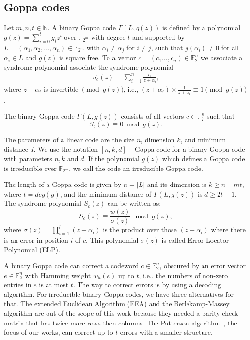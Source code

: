 \subsection{Goppa codes}
Let $m, n, t\in \mathbb{N}$. A binary Goppa code $\Gamma(L, g(z))$ is defined by a polynomial $g(z) = \sum_{i=0}^{t}g_iz^i$ over $\mathbb{F}_{2^m}$ with degree $t$ and supported by $L = (\alpha_1, \alpha_2, \dots, \alpha_n) \in \mathbb{F}_{2^m}$ with $\alpha_i \neq \alpha_j$ for $i\neq j$, such that $g(\alpha_i) \neq 0$ for all $\alpha_i \in L$ and $g(z)$ is square free. To a vector  $c = (c_1 \ldots, c_{n}) \in \mathbb{F}^n_{2}$ we associate a syndrome polynomial associate the syndrome polynomial
\begin{align}
  S_c(z) = \sum_{i=1}^{n} \frac{c_i}{z+\alpha_i},  
\end{align}
where ${z+\alpha_i}$ is invertible $\pmod{g(z)}$, i.e., $(z+\alpha_i) \times \frac{1}{z+\alpha_i} \equiv 1 \pmod{g(z)}$.
\begin{definition}
The binary Goppa code $\Gamma(L, g(z))$ consists of all vectors $c \in \mathbb{F}_{2}^n$ such that
\begin{equation}
    S_c(z) \equiv 0 \bmod{g(z)}.
\end{equation}
\end{definition}

The parameters of a linear code are the size $n$, dimension $k$, and minimum distance $d$. We use the notation $[n,k,d]-$Goppa code for a binary Goppa code with parameters $n,k$ and $d$. If the polynomial $g(z)$ which defines a Goppa code is irreducible over $\mathbb{F}_{2^m}$, we call the code an irreducible Goppa code.

The length of a Goppa code is given by $n = |L|$ and its dimension is $k \geq n-mt$, where $t = deg(g)$, and the minimum distance of $\Gamma(L, g(z))$ is $d \geq 2t + 1$. The syndrome polynomial $S_c(z)$ can be written as:
\begin{equation}
    S_c(z) \equiv \frac{w(z)}{\sigma(z)} \mod g(z),
\end{equation}
where $\sigma(z) = {\displaystyle \prod_{i=1}^{l}(z+\alpha_i)}$ is the product over those $(z+\alpha_i)$ where there is an error in position $i$ of $c$. This polynomial $\sigma(z)$ is called Error-Locator Polynomial (ELP).

A binary Goppa code can correct a codeword $c \in \mathbb{F}_{2}^n$, obscured by an error vector $e \in \mathbb{F}_{2}^n$ with Hamming weight $w_h(e)$ up to $t$, i.e., the numbers of non-zero entries in $e$ is at most $t$. The way to correct errors is by using a decoding algorithm. For irreducible binary Goppa codes, we have three alternatives for that. The extended Euclidean Algorithm (EEA) and the Berlekamp-Massey algorithm are out of the scope of this work because they needed a parity-check matrix that has twice more rows then columns. The Patterson algorithm~\cite{patterson1975algebraic}, the focus of our works, can correct up to $t$ errors with a smaller structure.

